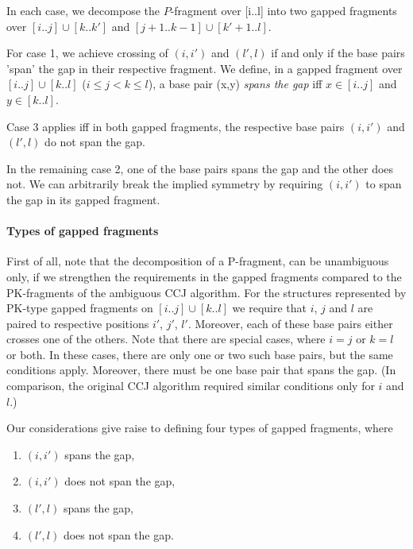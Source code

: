 \documentclass[11pt]{article} %
\def\mySecStr#1{\expandafter {\tt #1}\& }
\def\mySecStrAll#1{\ifx#1\mySecStrAll\else\mySecStr#1\expandafter\mySecStrAll\fi}
\newcommand{\RNA}[3][]{
\begin{tikzpicture}[baseline={([yshift=-.5ex]rna)}]
  \matrix[matrix of nodes,nodes=cell,ampersand replacement=\&] (rna){
		\mySecStrAll #2 \mySecStrAll\\
		};
\ifthenelse{\equal{#3}{}}{}{%
	\foreach \x/\y in {#3}{\draw (rna-1-\x) edge[bp] (rna-1-\y);}%
}
\ifthenelse{\equal{#1}{}}{}{%
		\foreach \x/\y in {#1}{\draw (rna-1-\x) edge[altbp] (rna-1-\y);}%
		}
\end{tikzpicture}}
\begin{document}
In each case, we decompose the $P$-fragment over [i..l] into two gapped fragments over $[i..j]\cup[k..k']$ and $[j+1..k-1]\cup[k'+1..l]$. 

%

For case 1, we achieve crossing of $(i,i')$ and $(l',l)$ if and only if the
base pairs 'span' the gap in their respective fragment. We define, in a gapped
fragment over $[i..j]\cup[k..l]$ ($i\leq j<k\leq l$), a base pair (x,y)
\emph{spans the gap} iff $x\in[i..j]$ and $y\in[k..l]$.

Case 3 applies iff in both gapped fragments, the respective base pairs $(i,i')$ and $(l',l)$ do not span the gap.

In the remaining case 2, one of the base pairs spans the gap and the other does
not. We can arbitrarily break the implied symmetry by requiring $(i,i')$ to
span the gap in its gapped fragment.

\paragraph{Types of gapped fragments}

First of all, note that the decomposition of a P-fragment, can be unambiguous
only, if we strengthen the requirements in the gapped fragments compared to the
PK-fragments of the ambiguous CCJ algorithm.  For the structures represented by
PK-type gapped fragments on $[i..j]\cup[k..l]$ we require that $i$, $j$ and $l$
are paired to respective positions $i'$, $j'$, $l'$. Moreover, each of these
base pairs either crosses one of the others.  Note that there are special
cases, where $i=j$ or $k=l$ or both. In these cases, there are only one or two
such base pairs, but the same conditions apply. Moreover, there must be one
base pair that spans the gap. (In comparison, the original CCJ algorithm
required similar conditions only for $i$ and $l$.)

Our considerations give raise to defining four types of gapped
fragments, where
\begin{enumerate}
\item $(i,i')$ spans the gap,
\item $(i,i')$ does not span the gap,
\item $(l',l)$ spans the gap,
\item $(l',l)$ does not span the gap.
\end{enumerate}
\end{document}

